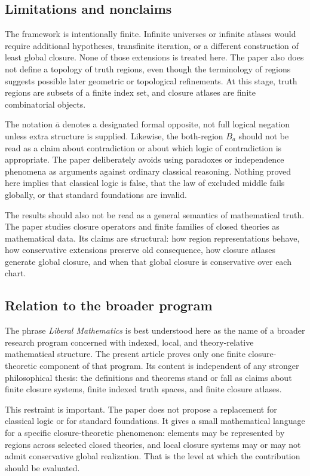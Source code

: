 \documentclass[11pt]{amsart}
\numberwithin{equation}{section}
\theoremstyle{plain}
\theoremstyle{definition}
\theoremstyle{remark}
\begin{document}
\subsection*{Limitations and nonclaims}

The framework is intentionally finite.  Infinite universes or infinite atlases would require additional hypotheses, transfinite iteration, or a different construction of least global closure.  None of those extensions is treated here.  The paper also does not define a topology of truth regions, even though the terminology of regions suggests possible later geometric or topological refinements.  At this stage, truth regions are subsets of a finite index set, and closure atlases are finite combinatorial objects.

The notation \(\bar a\) denotes a designated formal opposite, not full logical negation unless extra structure is supplied.  Likewise, the both-region \(B_a\) should not be read as a claim about contradiction or about which logic of contradiction is appropriate.  The paper deliberately avoids using paradoxes or independence phenomena as arguments against ordinary classical reasoning.  Nothing proved here implies that classical logic is false, that the law of excluded middle fails globally, or that standard foundations are invalid.

The results should also not be read as a general semantics of mathematical truth.  The paper studies closure operators and finite families of closed theories as mathematical data.  Its claims are structural: how region representations behave, how conservative extensions preserve old consequence, how closure atlases generate global closure, and when that global closure is conservative over each chart.

\subsection*{Relation to the broader program}

The phrase \emph{Liberal Mathematics} is best understood here as the name of a broader research program concerned with indexed, local, and theory-relative mathematical structure.  The present article proves only one finite closure-theoretic component of that program.  Its content is independent of any stronger philosophical thesis: the definitions and theorems stand or fall as claims about finite closure systems, finite indexed truth spaces, and finite closure atlases.

This restraint is important.  The paper does not propose a replacement for classical logic or for standard foundations.  It gives a small mathematical language for a specific closure-theoretic phenomenon: elements may be represented by regions across selected closed theories, and local closure systems may or may not admit conservative global realization.  That is the level at which the contribution should be evaluated.
\end{document}
